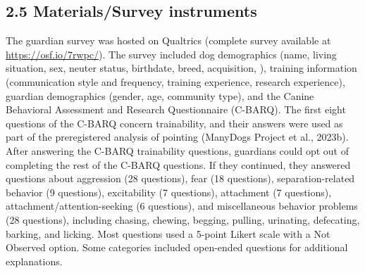 \documentclass[
  man,floatsintext]{apa6}
\begin{document}
\hypertarget{materialssurvey-instruments}{%
\subsection{2.5 Materials/Survey instruments}\label{materialssurvey-instruments}}

The guardian survey was hosted on Qualtrics (complete survey available at \url{https://osf.io/7rwpc/}). The survey included dog demographics (name, living situation, sex, neuter status, birthdate, breed, acquisition, ), training information (communication style and frequency, training experience, research experience), guardian demographics (gender, age, community type), and the Canine Behavioral Assessment and Research Questionnaire (C-BARQ). The first eight questions of the C-BARQ concern trainability, and their answers were used as part of the preregistered analysis of pointing (ManyDogs Project et al., 2023b). After answering the C-BARQ trainability questions, guardians could opt out of completing the rest of the C-BARQ questions. If they continued, they answered questions about aggression (28 questions), fear (18 questions), separation-related behavior (9 questions), excitability (7 questions), attachment (7 questions), attachment/attention-seeking (6 questions), and miscellaneous behavior problems (28 questions), including chasing, chewing, begging, pulling, urinating, defecating, barking, and licking. Most questions used a 5-point Likert scale with a Not Observed option. Some categories included open-ended questions for additional explanations.
\end{document}
